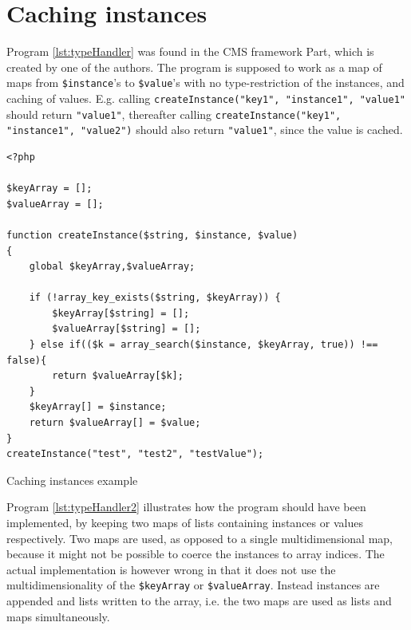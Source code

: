 \newpage
\section{Caching instances}
Program \ref{lst:typeHandler} was found in the CMS framework Part, which is created by one of the authors. The program is supposed to work as a map of maps from \texttt{\$instance}'s to \texttt{\$value}'s with no type-restriction of the instances, and caching of values. E.g. calling \texttt{createInstance("key1", "instance1", "value1"}  should return \texttt{"value1"}, thereafter calling \texttt{createInstance("key1", "instance1", "value2")} should also return \texttt{"value1"}, since the value is cached.

\begin{program}
\begin{lstlisting}
<?php

$keyArray = [];
$valueArray = [];

function createInstance($string, $instance, $value)
{
    global $keyArray,$valueArray;

    if (!array_key_exists($string, $keyArray)) {
        $keyArray[$string] = [];
        $valueArray[$string] = [];
    } else if(($k = array_search($instance, $keyArray, true)) !== false){
        return $valueArray[$k];
    }
    $keyArray[] = $instance;
    return $valueArray[] = $value;
}
createInstance("test", "test2", "testValue");
\end{lstlisting}
\caption{Caching instances example}
\label{lst:typeHandler}
\end{program}



Program \ref{lst:typeHandler2} illustrates how the program should have been implemented, by keeping two maps of lists containing instances or values respectively. Two maps are used, as opposed to a single multidimensional map, because it might not be possible to coerce the instances to array indices. The actual implementation is however wrong in that it does not use the multidimensionality of the \texttt{\$keyArray} or \texttt{\$valueArray}. Instead instances are appended and lists written to the array, i.e. the two maps are used as lists and maps simultaneously. 




